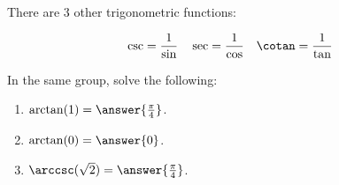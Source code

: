\documentclass{ximera}
\begin{document}
There are 3 other trigonometric functions:

\[
\csc =\frac{1}{\sin } \quad \sec =\frac{1}{\cos } \quad \cotan=\frac{1}{\tan }
\]

\begin{exercise}\label{exercise:2-8}
In the same group, solve the following:
\begin{enumerate}
  \item $\arctan (1)=\answer{\frac{\pi}{4}}$.
  \item $\arctan (0)=\answer{0}$.
  \item $\arccsc(\sqrt{2})=\answer{\frac{\pi}{4}}$.
\end{enumerate}
\end{exercise}
\end{document}
